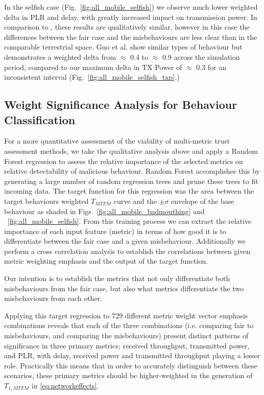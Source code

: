 \documentclass[conference]{IEEEtran}
\begin{document}
In the selfish case (Fig.~\ref{fig:all_mobile_selfish}) we observe much lower weighted delta in PLR and delay, with greatly increased impact on transmission power.
In comparison to \cite{Guo11}, these results are qualitatively similar, however in this case the differences between the fair case and the misbehaviours are less clear than in the comparable terrestrial space.
Guo et al. show similar types of behaviour but demonstrates a weighted delta from $\approx$ 0.4 to $\approx$ 0.9 across the simulation period, compared to our maximum delta in TX Power of $\approx$ 0.3 for an inconsistent interval (Fig.~\ref{fig:all_mobile_selfish_txp}.)


\subsection{Weight Significance Analysis for Behaviour Classification}

For a more quantitative assessment of the viability of multi-metric trust assessment methods, we take the qualitative analysis above and apply a Random Forest regression \cite{Breiman2001} to assess the relative importance of the selected metrics on relative detectability of malicious behaviour. 
Random Forest accomplishes this by generating a large number of random regression trees and prune these trees to fit incoming data.
The target function for this regression was the area between the target behaviours weighted $T_{MTFM}$ curve and the $\pm\sigma$ envelope of the base behaviour as shaded in Figs.~\ref{fig:all_mobile_badmouthing} and ~\ref{fig:all_mobile_selfish}.
From this training process we can extract the relative importance of each input feature (metric) in terms of how good it is to differentiate between the fair case and a given misbehaviour.
Additionally we perform a cross correlation analysis to establish the correlations between given metric weighting emphasis and the output of the target function.

Our intention is to establish the metrics that not only differentiate both misbehaviours from the fair case, but also what metrics differentiate the two misbehaviours from each other.

Applying this target regression to 729 different metric weight vector emphasis combinations reveals that each of the three combinations (i.e. comparing fair to misbehaviours, and comparing the misbehaviours) present distinct patterns of significance in three primary metrics; received throughput, transmitted power, and PLR, with delay, received power and transmitted throughput playing a lesser role.
Practically this means that in order to accurately distinguish between these scenarios, these primary metrics should be higher-weighted in the generation of $T_{1,MTFM}$ in \eqref{eq:networkeffects}.
\end{document}
